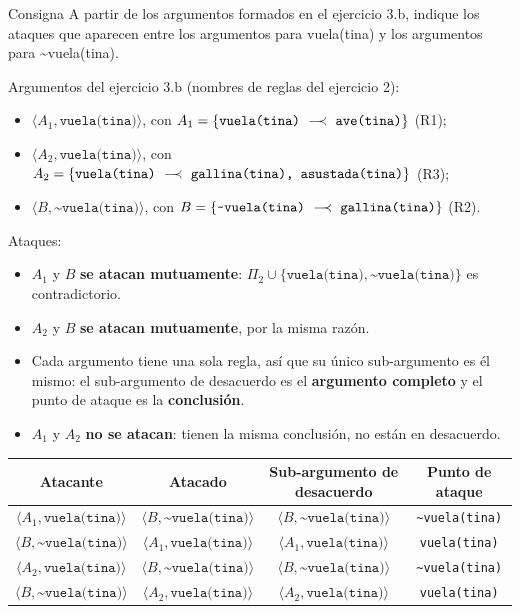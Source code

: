 \documentclass[11pt,a4paper]{article}
\newcommand{\nf}{\textasciitilde}                 %
\newcommand{\reb}{\mathrel{-\!\!\!\prec}}         %
\newcommand{\regla}[3]{\text{\texttt{#1}}~\ensuremath{#2}~\text{\texttt{#3}}}
\begin{document}
\begin{enunciado}{Consigna}
A partir de los argumentos formados en el ejercicio 3.b, indique los ataques que aparecen entre los argumentos para vuela(tina) y los argumentos para \nf vuela(tina).
\end{enunciado}

Argumentos del ejercicio 3.b (nombres de reglas del ejercicio 2):
\begin{itemize}
  \item $\langle A_1, \texttt{vuela(tina)}\rangle$, con $A_1 = \{\regla{vuela(tina)}{\reb}{ave(tina)}\}$ (R1);
  \item $\langle A_2, \texttt{vuela(tina)}\rangle$, con $A_2 = \{\regla{vuela(tina)}{\reb}{gallina(tina), asustada(tina)}\}$ (R3);
  \item $\langle B, \texttt{\nf vuela(tina)}\rangle$, con $B = \{\regla{\nf vuela(tina)}{\reb}{gallina(tina)}\}$ (R2).
\end{itemize}

Ataques:
\begin{itemize}
  \item $A_1$ y $B$ \textbf{se atacan mutuamente}: $\Pi_2 \cup \{\texttt{vuela(tina)}, \texttt{\nf vuela(tina)}\}$ es contradictorio.
  \item $A_2$ y $B$ \textbf{se atacan mutuamente}, por la misma razón.
  \item Cada argumento tiene una sola regla, así que su único sub-argumento es él mismo: el sub-argumento de desacuerdo es el \textbf{argumento completo} y el punto de ataque es la \textbf{conclusión}.
  \item $A_1$ y $A_2$ \textbf{no se atacan}: tienen la misma conclusión, no están en desacuerdo.
\end{itemize}

\begin{center}
\small
\begin{tabular}{@{}c c c c@{}}
\toprule
\textbf{Atacante} & \textbf{Atacado} & \textbf{Sub-argumento de desacuerdo} & \textbf{Punto de ataque} \\
\midrule
$\langle A_1, \texttt{vuela(tina)}\rangle$ & $\langle B, \texttt{\nf vuela(tina)}\rangle$ & $\langle B, \texttt{\nf vuela(tina)}\rangle$ & \texttt{\nf vuela(tina)} \\
$\langle B, \texttt{\nf vuela(tina)}\rangle$ & $\langle A_1, \texttt{vuela(tina)}\rangle$ & $\langle A_1, \texttt{vuela(tina)}\rangle$ & \texttt{vuela(tina)} \\
$\langle A_2, \texttt{vuela(tina)}\rangle$ & $\langle B, \texttt{\nf vuela(tina)}\rangle$ & $\langle B, \texttt{\nf vuela(tina)}\rangle$ & \texttt{\nf vuela(tina)} \\
$\langle B, \texttt{\nf vuela(tina)}\rangle$ & $\langle A_2, \texttt{vuela(tina)}\rangle$ & $\langle A_2, \texttt{vuela(tina)}\rangle$ & \texttt{vuela(tina)} \\
\bottomrule
\end{tabular}
\end{center}
\end{document}
